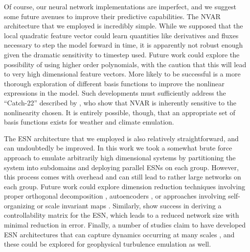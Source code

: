 Of course, our neural network implementations are imperfect, and we suggest some
future avenues to improve their predictive capabilities.
The NVAR architecture that we employed is incredibly simple.
While we supposed that the local quadratic feature vector could learn
quantities like derivatives and fluxes necessary to step the model forward in
time, it is apparently not robust enough
given the dramatic sensitivity to timestep used.
Future work could explore the possibility of using higher order polynomials,
with the caution that this will lead to very high dimensional feature vectors.
More likely to be successful is a more thorough exploration of different basis
functions to improve the nonlinear expressions in the model.
Such developments must sufficiently address the ``Catch-22''
described by \citet{zhang_catch-22_2022}, who show that NVAR is inherently
sensitive to the nonlinearity chosen.
It is entirely possible, though, that an appropriate set of basis functions exists
for weather and climate emulation.

The ESN architecture that we employed is also relatively straightforward, and
can undoubtedly be improved.
In this work we took a somewhat brute force approach to emulate arbitrarily
high dimensional systems by partitioning the system into subdomains and
deploying parallel ESNs on each group.
However, this process comes with overhead and can still lead to rather large
networks on each group.
Future work could explore dimension reduction techniques involving
proper orthogonal decomposition \citep{jordanou_investigation_2022},
autoencoders \citep{heyder_generalizability_2022},
or approaches involving self-organizing or scale invariant maps
\citep{basterrech_self-organizing_2011}.
Similarly, \citet{whiteaker_reducing_2022}
show success in deriving a controllability matrix for the
ESN, which leads to a reduced network size with minimal reduction in
error.
Finally, a number of studies claim to have developed ESN architectures that
can capture dynamics occurring at many scales
\citep{moon_hierarchical_2021,ma_deepr-esn_2020,gallicchio_design_2018,gallicchio_deep_2017,malik_multilayered_2017},
and these could be
explored for geophysical turbulence emulation as well.
